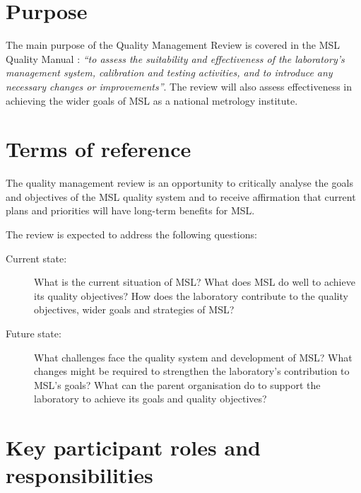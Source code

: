 \section{Purpose}
The main purpose of the Quality Management Review is covered in the MSL Quality Manual \cite[\S\ref*{QM-ss:management_review}]{MSL_Quality_Manual}: 
\textit{``to assess the suitability and effectiveness of the laboratory's management
system, calibration and testing activities, and to introduce any necessary changes or improvements''}. The review will also assess effectiveness in achieving the wider goals of MSL as a
national metrology institute.

\section{Terms of reference}
The quality management review is an opportunity to critically analyse the goals and objectives of the MSL quality system and to receive affirmation that current plans and priorities
will have long-term benefits for MSL.

The review is expected to address the following questions:
\begin{description}
\item[Current state: ]What is the current situation of MSL? What does MSL do well to achieve
its quality objectives? How does the laboratory contribute to the quality objectives, wider
goals and strategies of MSL?

\item[Future state: ]What challenges face the quality system and development of MSL? What
changes might be required to strengthen the laboratory's contribution to MSL's goals? What
can the parent organisation do to support the laboratory to achieve its goals and quality
objectives?
\end{description}


\section{Key participant roles and responsibilities}
